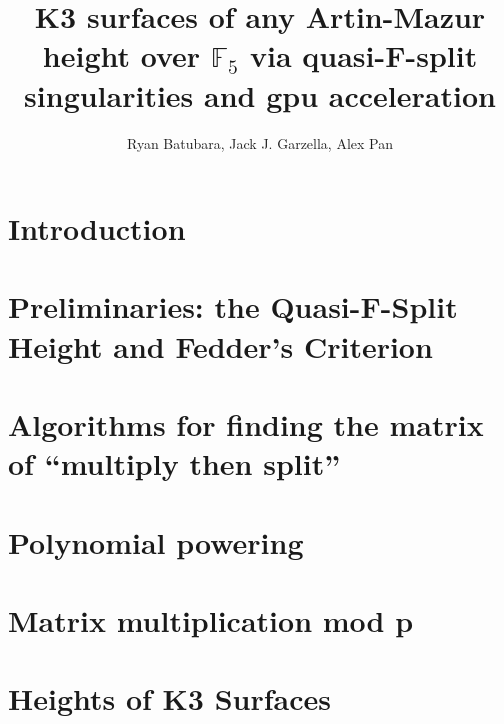 \documentclass[a4paper]{article}
\title{K3 surfaces of any Artin-Mazur height over \(\mathbb{F}_{5}\) via quasi-F-split singularities and gpu acceleration}
\author{Ryan Batubara, Jack J. Garzella, Alex Pan}
\begin{document}
\maketitle

\section{Introduction}



\section{Preliminaries: the Quasi-F-Split Height and Fedder's Criterion}



\section{Algorithms for finding the matrix of ``multiply then split''}



\section{Polynomial powering}



\section{Matrix multiplication mod p}



\section{Heights of K3 Surfaces}






\end{document}
